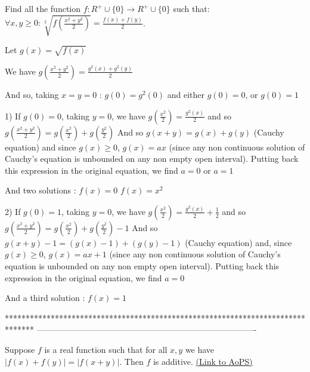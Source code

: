 \begin{mysolution}
	\begin{tcolorbox}Find all the function $ f: R^ + \cup {\{0}\}\longrightarrow R^ + \cup {\{0}\}$ such that:
$ \forall x,y\geq 0: \sqrt [2]{f(\frac {x^2 + y^2}{2})} = \frac {f(x) + f(y)}{2}$. \end{tcolorbox}

Let $ g(x)=\sqrt{f(x)}$

We have $ g(\frac {x^2 + y^2}{2})= \frac {g^2(x) + g^2(y)}{2}$

And so, taking $ x=y=0$ : $ g(0)=g^2(0)$ and either $ g(0)=0$, or $ g(0)=1$

1) If $ g(0)=0$, taking $ y=0$, we have $ g(\frac {x^2}{2})= \frac {g^2(x)}{2}$ and so $ g(\frac {x^2 + y^2}{2})=g(\frac {x^2}{2})+g(\frac {y^2}{2})$
And so $ g(x+y)=g(x)+g(y)$ (Cauchy equation) and since $ g(x)\geq 0$, $ g(x)=ax$ (since any non continuous solution of Cauchy's equation is unbounded on any non empty open  interval).
Putting back this expression in the original equation, we find $ a=0$ or $ a=1$

And two solutions :
$ f(x)=0$
$ f(x)=x^2$

2) If $ g(0)=1$, taking $ y=0$, we have $ g(\frac {x^2}{2})= \frac {g^2(x)}{2}+\frac{1}{2}$ and so $ g(\frac {x^2 + y^2}{2})=g(\frac {x^2}{2})+g(\frac {y^2}{2})-1$
And so $ g(x+y)-1=(g(x)-1)+(g(y)-1)$ (Cauchy equation) and, since $ g(x)\geq 0$, $ g(x)=ax+1$ (since any non continuous solution of Cauchy's equation is unbounded on any non empty open  interval).
Putting back this expression in the original equation, we find $ a=0$

And a third solution :
$ f(x)=1$
\end{mysolution}
*******************************************************************************
-------------------------------------------------------------------------------

\begin{problem}
	Suppose $f$ is a real function such that for all $x,y$ we have $|f(x)+f(y)|=|f(x+y)|$. Then $f$ is additive.
	\flushright \href{https://artofproblemsolving.com/community/c6h45038}{(Link to AoPS)}
\end{problem}



